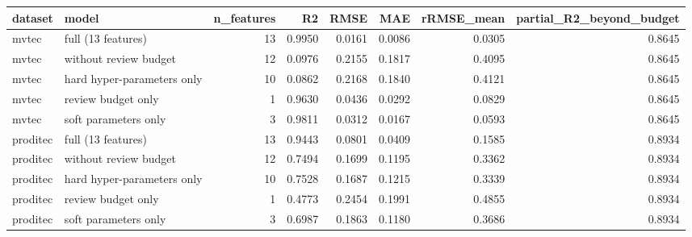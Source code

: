 \begin{tabular}{llrrrrrr}
\toprule
 dataset &                      model &  n\_features &     R2 &   RMSE &    MAE &  rRMSE\_mean &  partial\_R2\_beyond\_budget \\
\midrule
   mvtec &         full (13 features) &          13 & 0.9950 & 0.0161 & 0.0086 &      0.0305 &                    0.8645 \\
   mvtec &      without review budget &          12 & 0.0976 & 0.2155 & 0.1817 &      0.4095 &                    0.8645 \\
   mvtec & hard hyper-parameters only &          10 & 0.0862 & 0.2168 & 0.1840 &      0.4121 &                    0.8645 \\
   mvtec &         review budget only &           1 & 0.9630 & 0.0436 & 0.0292 &      0.0829 &                    0.8645 \\
   mvtec &       soft parameters only &           3 & 0.9811 & 0.0312 & 0.0167 &      0.0593 &                    0.8645 \\
proditec &         full (13 features) &          13 & 0.9443 & 0.0801 & 0.0409 &      0.1585 &                    0.8934 \\
proditec &      without review budget &          12 & 0.7494 & 0.1699 & 0.1195 &      0.3362 &                    0.8934 \\
proditec & hard hyper-parameters only &          10 & 0.7528 & 0.1687 & 0.1215 &      0.3339 &                    0.8934 \\
proditec &         review budget only &           1 & 0.4773 & 0.2454 & 0.1991 &      0.4855 &                    0.8934 \\
proditec &       soft parameters only &           3 & 0.6987 & 0.1863 & 0.1180 &      0.3686 &                    0.8934 \\
\bottomrule
\end{tabular}
